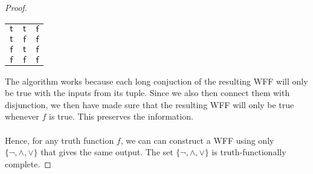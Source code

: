 \documentclass[12pt]{article}
\begin{document}
\begin{proof}
\begin{center}
\begin{tabular}{cc|c}
            $\mathsf{t}$ & $\mathsf{t}$ & $\mathsf{f}$ \\
            $\mathsf{t}$ & $\mathsf{f}$ & $\mathsf{f}$ \\
            $\mathsf{f}$ & $\mathsf{t}$ & $\mathsf{f}$ \\
            $\mathsf{f}$ & $\mathsf{f}$ & $\mathsf{f}$ \\
        \end{tabular}
    \end{center}
$$$$
The algorithm works because each long conjuction of the resulting WFF will only be true with the inputs from its tuple.
Since we also then connect them with disjunction, we then have made sure that the resulting WFF will only be true whenever $f$ is true.
This preserves the information.\\
\\
Hence, for any truth function $f$, we can can construct a WFF using only $\{\neg, \land, \lor\}$ that gives the same output.
The set $\{\neg, \land, \lor\}$ is truth-functionally complete.

\end{proof}
\end{document}
